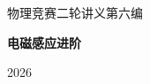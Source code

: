 \documentclass[11pt,b5paper,twoside,openany]{ctexbook}
\begin{document}
\frontmatter
\begin{titlepage}\centering\vspace*{30mm}
{\Large 物理竞赛二轮讲义\quad 第六编\par}\vspace{8mm}

{\Huge\bfseries 电磁感应进阶\par}
\vspace{12mm}{\Large 物理竞赛二轮讲义\par}
\vspace{10mm}{\large 第一讲至第四讲\par}
\vfill{\large 2026\par}\end{titlepage}
\tableofcontents\let\cleardoublepage\clearpage\mainmatter




\end{document}
